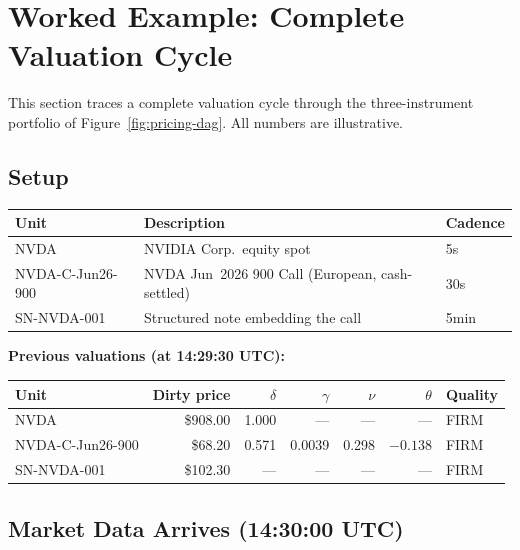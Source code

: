 \documentclass[11pt,a4paper]{article}
\begin{document}
\clearpage
\section{Worked Example: Complete Valuation Cycle}
\label{sec:worked-example}

This section traces a complete valuation cycle through the three-instrument portfolio of Figure~\ref{fig:pricing-dag}.  All numbers are illustrative.

\subsection{Setup}

\begin{center}
\small
\begin{tabular}{l l l}
\toprule
\textbf{Unit} & \textbf{Description} & \textbf{Cadence} \\
\midrule
NVDA & NVIDIA Corp.\ equity spot & 5s \\
NVDA-C-Jun26-900 & NVDA Jun~2026 900 Call (European, cash-settled) & 30s \\
SN-NVDA-001 & Structured note embedding the call & 5min \\
\bottomrule
\end{tabular}
\end{center}

\noindent\textbf{Previous valuations (at 14:29:30 UTC):}

\begin{center}
\small
\begin{tabular}{l r r r r r l}
\toprule
\textbf{Unit} & \textbf{Dirty price} & \textbf{$\delta$} & \textbf{$\gamma$} & \textbf{$\nu$} & \textbf{$\theta$} & \textbf{Quality} \\
\midrule
NVDA & \$908.00 & 1.000 & --- & --- & --- & FIRM \\
NVDA-C-Jun26-900 & \$68.20 & 0.571 & 0.0039 & 0.298 & $-0.138$ & FIRM \\
SN-NVDA-001 & \$102.30 & --- & --- & --- & --- & FIRM \\
\bottomrule
\end{tabular}
\end{center}

\subsection{Market Data Arrives (14:30:00 UTC)}
\end{document}
